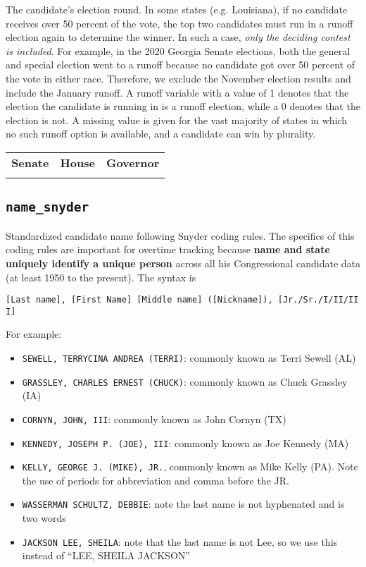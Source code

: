 \documentclass[12pt]{article}
\begin{document}
The candidate's election round. In some states (e.g. Louisiana), if no candidate receives over 50 percent of the vote, the top two candidates must run in a runoff election again to determine the winner. 
In such a case, \emph{only the deciding contest is included}. For example, in the 2020 Georgia Senate elections, both the general and special election went to a runoff because no candidate got over 50 percent of the vote in either race. Therefore, we exclude the November election results and include the January runoff. 
A runoff variable with a value of 1 denotes that the election the candidate is running in is a runoff election, while a 0 denotes that the election is not. A missing value is given for the vast majority of states in which no such runoff option is available, and a candidate can win by plurality.
\begin{table}[!h]
\begin{tabularx}{\linewidth}{CCC}
    \textbf{Senate} & \textbf{House} & \textbf{Governor}\\
     &  & 
\end{tabularx}
\end{table}


\FloatBarrier

\subsection*{\texttt{name\_snyder}}


Standardized candidate name following Snyder coding rules. The
specifics of this coding rules are important for overtime tracking because
\textbf{name and state uniquely identify a unique person} across all his
Congressional candidate data (at least 1950 to the present). The syntax
is

\texttt{{[}Last\ name{]},\ {[}First\ Name{]}\ {[}Middle\ name{]}\ ({[}Nickname{]}),\ {[}Jr./Sr./I/II/III{]}}

For example:

\begin{itemize}
\tightlist
\item
  \texttt{SEWELL,\ TERRYCINA\ ANDREA\ (TERRI)}: commonly known as Terri
  Sewell (AL)
\item
  \texttt{GRASSLEY,\ CHARLES\ ERNEST\ (CHUCK)}: commonly known as Chuck
  Grassley (IA)
\item
  \texttt{CORNYN,\ JOHN,\ III}: commonly known as John Cornyn (TX)
\item
  \texttt{KENNEDY,\ JOSEPH\ P.\ (JOE),\ III}: commonly known as Joe
  Kennedy (MA)
\item
  \texttt{KELLY,\ GEORGE\ J.\ (MIKE),\ JR.}, commonly known as Mike
  Kelly (PA). Note the use of periods for abbreviation and comma before
  the JR.
\item
  \texttt{WASSERMAN\ SCHULTZ,\ DEBBIE}: note the last name is not
  hyphenated and is two words
\item
  \texttt{JACKSON\ LEE,\ SHEILA}: note that the last name is not Lee, so
  we use this instead of ``LEE, SHEILA JACKSON''
\end{itemize}
\end{document}
